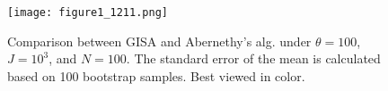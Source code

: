\documentclass[onecolumn,11pt]{article}
\newcommand{\highlight}[1]{{\textcolor{blue}{{#1}}}}
\newcommand{\highlight}[1]{{{#1}}}
\begin{document}
\begin{figure}
\centering
\texttt{[image: figure1\_1211.png]}
\caption{Comparison between GISA and Abernethy's alg. under $\theta=100$, $J=10^3$, and $N=100$. The standard error of the mean is calculated based on 100 bootstrap samples. Best viewed in color.}
\label{fig:theta100}
\end{figure}
\end{document}
